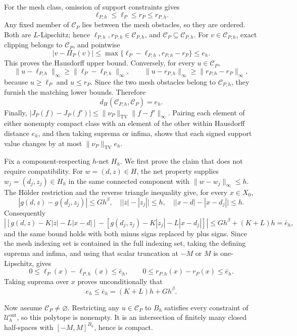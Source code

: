 For the mesh class, omission of support constraints gives
\[
 \ell_{P,h}\leq\ell_P\leq r_P\leq r_{P,h}.
\]
Any fixed member of \(\mathcal C_P\) lies between the mesh obstacles, so they are ordered.  Both are \(L\)-Lipschitz; hence \(\ell_{P,h},r_{P,h}\in\mathcal C_{P,h}\), and \(\mathcal C_P\subseteq\mathcal C_{P,h}\).  For \(v\in\mathcal C_{P,h}\), exact clipping belongs to \(\mathcal C_P\), and pointwise
\[
 |v-\Pi_P(v)|
 \leq\max\{\ell_P-\ell_{P,h},r_{P,h}-r_P\}
 \leq e_h.
\]
This proves the Hausdorff upper bound.  Conversely, for every \(u\in\mathcal C_P\),
\[
 \|u-\ell_{P,h}\|_\infty
 \geq\|\ell_P-\ell_{P,h}\|_\infty,
 \qquad
 \|u-r_{P,h}\|_\infty
 \geq\|r_{P,h}-r_P\|_\infty,
\]
because \(u\geq\ell_P\) and \(u\leq r_P\).  Since the two mesh obstacles belong to \(\mathcal C_{P,h}\), they furnish the matching lower bounds.  Therefore
\[
 d_H(\mathcal C_{P,h},\mathcal C_P)=e_h.
\]
Finally, \(|J_P(f)-J_P(f')|\leq\|\nu_P\|_{\mathrm{TV}}\|f-f'\|_\infty\).  Pairing each element of either nonempty compact class with an element of the other within Hausdorff distance \(e_h\), and then taking suprema or infima, shows that each signed support value changes by at most \(\|\nu_P\|_{\mathrm{TV}}e_h\).

Fix a component-respecting \(h\)-net \(H_h\).  We first prove the claim that does not require compatibility.  For \(w=(d,z)\in H\), the net property supplies \(w_j=(d_j,z_j)\in H_h\) in the same connected component with \(\|w-w_j\|_\infty\leq h\).  The H\"older restriction and the reverse triangle inequality give, for every \(x\in X_0\),
\[
 |g(d,z)-g(d_j,z_j)|\leq Gh^\beta,
 \quad
 \bigl||z|-|z_j|\bigr|\leq h,
 \quad
 \bigl||x-d|-|x-d_j|\bigr|\leq h.
\]
Consequently
\[
 \left|[g(d,z)-K|z|-L|x-d|]-[g(d_j,z_j)-K|z_j|-L|x-d_j|]\right|
 \leq Gh^\beta+(K+L)h=\bar e_h,
\]
and the same bound holds with both minus signs replaced by plus signs.  Since the mesh indexing set is contained in the full indexing set, taking the defining suprema and infima, and using that scalar truncation at \(-M\) or \(M\) is one-Lipschitz, gives
\[
 0\leq\ell_P(x)-\ell_{P,h}(x)\leq\bar e_h,
 \qquad
 0\leq r_{P,h}(x)-r_P(x)\leq\bar e_h.
\]
Taking suprema over \(x\) proves unconditionally that
\[
 e_h\leq\bar e_h=(K+L)h+Gh^\beta.
\]

Now assume \(\mathcal C_P\neq\varnothing\).  Restricting any \(u\in\mathcal C_P\) to \(B_h\) satisfies every constraint of \(\mathcal U_h^{\mathrm{out}}\), so this polytope is nonempty.  It is an intersection of finitely many closed half-spaces with \([-M,M]^{B_h}\), hence is compact.

